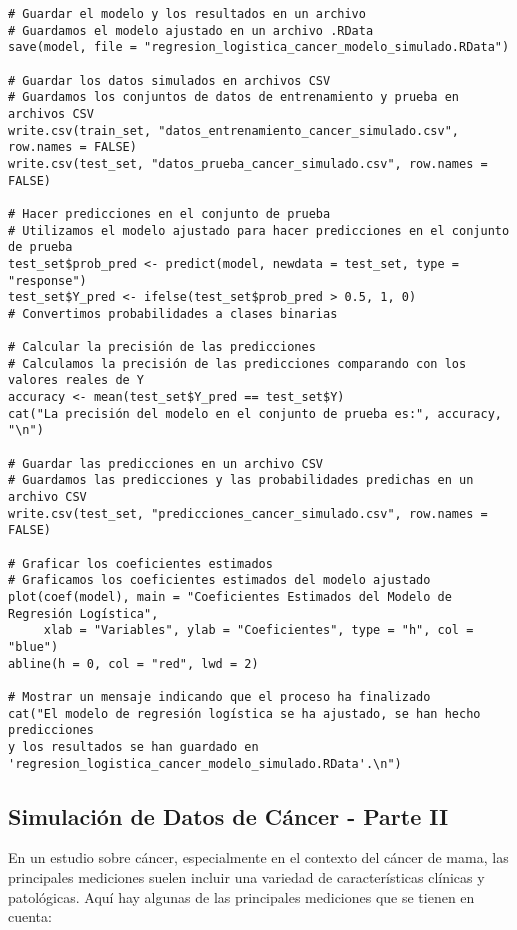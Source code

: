 \begin{verbatim}
# Guardar el modelo y los resultados en un archivo
# Guardamos el modelo ajustado en un archivo .RData
save(model, file = "regresion_logistica_cancer_modelo_simulado.RData")

# Guardar los datos simulados en archivos CSV
# Guardamos los conjuntos de datos de entrenamiento y prueba en archivos CSV
write.csv(train_set, "datos_entrenamiento_cancer_simulado.csv", row.names = FALSE)
write.csv(test_set, "datos_prueba_cancer_simulado.csv", row.names = FALSE)

# Hacer predicciones en el conjunto de prueba
# Utilizamos el modelo ajustado para hacer predicciones en el conjunto de prueba
test_set$prob_pred <- predict(model, newdata = test_set, type = "response")
test_set$Y_pred <- ifelse(test_set$prob_pred > 0.5, 1, 0)  
# Convertimos probabilidades a clases binarias

# Calcular la precisión de las predicciones
# Calculamos la precisión de las predicciones comparando con los valores reales de Y
accuracy <- mean(test_set$Y_pred == test_set$Y)
cat("La precisión del modelo en el conjunto de prueba es:", accuracy, "\n")

# Guardar las predicciones en un archivo CSV
# Guardamos las predicciones y las probabilidades predichas en un archivo CSV
write.csv(test_set, "predicciones_cancer_simulado.csv", row.names = FALSE)

# Graficar los coeficientes estimados
# Graficamos los coeficientes estimados del modelo ajustado
plot(coef(model), main = "Coeficientes Estimados del Modelo de Regresión Logística", 
     xlab = "Variables", ylab = "Coeficientes", type = "h", col = "blue")
abline(h = 0, col = "red", lwd = 2)

# Mostrar un mensaje indicando que el proceso ha finalizado
cat("El modelo de regresión logística se ha ajustado, se han hecho predicciones 
y los resultados se han guardado en 'regresion_logistica_cancer_modelo_simulado.RData'.\n")
\end{verbatim}

\subsection{Simulaci\'on de Datos de Cáncer - Parte II}

En un estudio sobre cáncer, especialmente en el contexto del cáncer de mama, las principales mediciones suelen incluir una variedad de características clínicas y patológicas. Aquí hay algunas de las principales mediciones que se tienen en cuenta:

